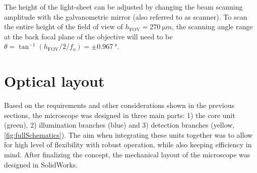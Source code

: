     The height of the light-sheet can be adjusted by changing the beam scanning amplitude with the galvanometric mirror (also referred to as scanner). To scan the entire height of the field of view of $h_{\mathrm{FOV}} = \SI{270}{\micro m}$, the scanning angle range at the back focal plane of the objective will need to be $ \theta = \tan^{-1}(h_{\mathrm{FOV}}/2/f_o) = \pm \SI{0.967}{\degree}$.


      


\section{Optical layout}
  
  Based on the requirements and other considerations shown in the previous sections, the microscope was designed in three main parts: 1) the core unit (green), 2) illumination branches (blue) and 3) detection branches (yellow, \autoref{fig:fullSchematics}). The aim when integrating these units together was to allow for high level of flexibility with robust operation, while also keeping efficiency in mind. After finalizing the concept, the mechanical layout of the microscope was designed in SolidWorks.


